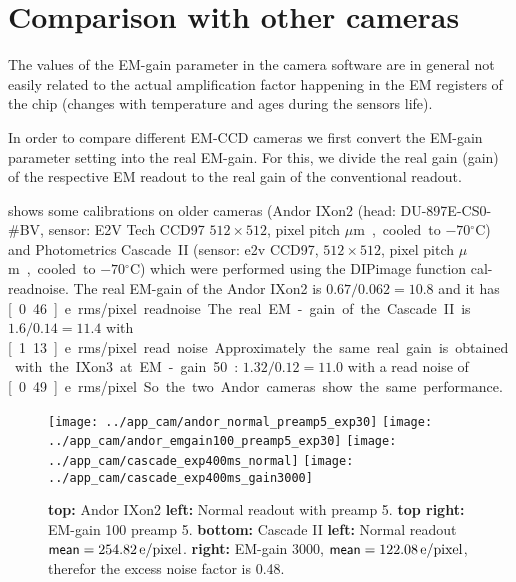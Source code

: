 \section{Comparison with other cameras}
The values of the EM-gain parameter in the camera software are in
general not easily related to the actual amplification factor
happening in the EM registers of the chip (changes with temperature
and ages during the sensors life). 

In order to compare different EM-CCD cameras we first convert the
EM-gain parameter setting into the real EM-gain. For this, we divide
the real gain (\textsf{gain}) of the respective EM readout to the real
gain of the conventional readout.

 shows some calibrations on older cameras (Andor
IXon2 (head: DU-897E-CS0-\#BV, sensor: E2V Tech CCD97 $512\times512$,
pixel pitch \unit[16]{$\mu$m}, cooled to $-70{}^\circ\textrm{C}$) and
Photometrics Cascade~II (sensor: e2v CCD97, $512\times512$, pixel
pitch \unit[16]{$\mu$m}, cooled to $-70{}^\circ\textrm{C}$) which were
performed using the DIPimage function \textsf{cal-readnoise}.  The
real EM-gain of the Andor IXon2 is $0.67/0.062=10.8$ and it has
\unit[0.46]{e\ rms/pixel} readnoise. The real EM-gain of the Cascade~II
is $1.6/0.14=11.4$ with \unit[1.13]{e\ rms/pixel} read
noise. Approximately the same real gain is obtained with the IXon3 at
EM-gain 50: $1.32/0.12=11.0$ with a read noise of \unit[0.49]{e\
  rms/pixel}. So the two Andor cameras show the same performance.

\begin{figure}
  \centering
  \texttt{[image: ../app\_cam/andor\_normal\_preamp5\_exp30]}
  \texttt{[image: ../app\_cam/andor\_emgain100\_preamp5\_exp30]}
  \texttt{[image: ../app\_cam/cascade\_exp400ms\_normal]}
  \texttt{[image: ../app\_cam/cascade\_exp400ms\_gain3000]}
  \caption{{\bf top:} Andor IXon2 {\bf left:} Normal readout with
    preamp 5. {\bf top right:} EM-gain 100 preamp 5. {\bf bottom:}
    Cascade II {\bf left:} Normal readout
    $\textsf{mean}=\unit[254.82]{e/pixel}$. {\bf right:} EM-gain 3000,
    $\textsf{mean}=\unit[122.08]{e/pixel}$, therefor the excess noise
    factor is 0.48.}
  \label{fig:old-cams}
\end{figure}



